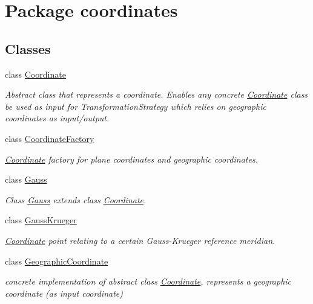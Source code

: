 \hypertarget{namespacecoordinates}{}\section{Package coordinates}
\label{namespacecoordinates}
\subsection*{Classes}
\begin{DoxyCompactItemize}
\item 
class \hyperlink{classcoordinates_1_1_coordinate}{Coordinate}
\begin{DoxyCompactList}\small\item\em Abstract class that represents a coordinate. Enables any concrete \hyperlink{classcoordinates_1_1_coordinate}{Coordinate} class be used as input for Transformation\+Strategy which relies on geographic coordinates as input/output. \end{DoxyCompactList}\item 
class \hyperlink{classcoordinates_1_1_coordinate_factory}{Coordinate\+Factory}
\begin{DoxyCompactList}\small\item\em \hyperlink{classcoordinates_1_1_coordinate}{Coordinate} factory for plane coordinates and geographic coordinates. \end{DoxyCompactList}\item 
class \hyperlink{classcoordinates_1_1_gauss}{Gauss}
\begin{DoxyCompactList}\small\item\em Class \hyperlink{classcoordinates_1_1_gauss}{Gauss} extends class \hyperlink{classcoordinates_1_1_coordinate}{Coordinate}. \end{DoxyCompactList}\item 
class \hyperlink{classcoordinates_1_1_gauss_krueger}{Gauss\+Krueger}
\begin{DoxyCompactList}\small\item\em \hyperlink{classcoordinates_1_1_coordinate}{Coordinate} point relating to a certain Gauss-\/\+Krueger reference meridian. \end{DoxyCompactList}\item 
class \hyperlink{classcoordinates_1_1_geographic_coordinate}{Geographic\+Coordinate}
\begin{DoxyCompactList}\small\item\em concrete implementation of abstract class \hyperlink{classcoordinates_1_1_coordinate}{Coordinate}, represents a geographic coordinate (as input coordinate)~\newline

\end{DoxyCompactList}
\end{DoxyCompactItemize}
